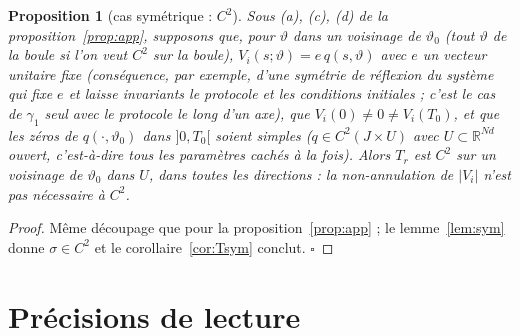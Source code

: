 \documentclass[11pt,a4paper]{article}
\newtheorem{proposition}[theoreme]{Proposition}
\theoremstyle{remark}
\newcommand{\R}{\mathbb R}
\newcommand{\vth}{\vartheta}
\begin{document}
\begin{proposition}[cas symétrique : $C^2$]\label{prop:sym}
Sous (a), (c), (d) de la proposition~\ref{prop:app}, supposons que, pour $\vth$ dans un voisinage de $\vth_0$ (tout $\vth$ de la boule si l'on veut $C^2$ sur la boule), $V_i(s;\vth)=e\,q(s,\vth)$ avec $e$ un vecteur unitaire fixe (conséquence, par exemple, d'une symétrie de réflexion du système qui fixe $e$ et laisse invariants le protocole et les conditions initiales ; c'est le cas de $\gamma_1$ seul avec le protocole le long d'un axe), que $V_i(0)\ne0\ne V_i(T_0)$, et que les zéros de $q(\cdot,\vth_0)$ dans $]0,T_0[$ soient simples ($q\in C^2(J\times U)$ avec $U\subset\R^{Nd}$ ouvert, c'est-à-dire tous les paramètres cachés à la fois). Alors $T_r$ est $C^2$ sur un voisinage de $\vth_0$ dans $U$, dans toutes les directions : la non-annulation de $\lvert V_i\rvert$ n'est pas nécessaire à $C^2$.
\end{proposition}
\begin{proof}
Même découpage que pour la proposition~\ref{prop:app} ; le lemme~\ref{lem:sym} donne $\sigma\in C^2$ et le corollaire~\ref{cor:Tsym} conclut. $\square$
\end{proof}

\section{Précisions de lecture}\label{sec:lecture}
\end{document}
